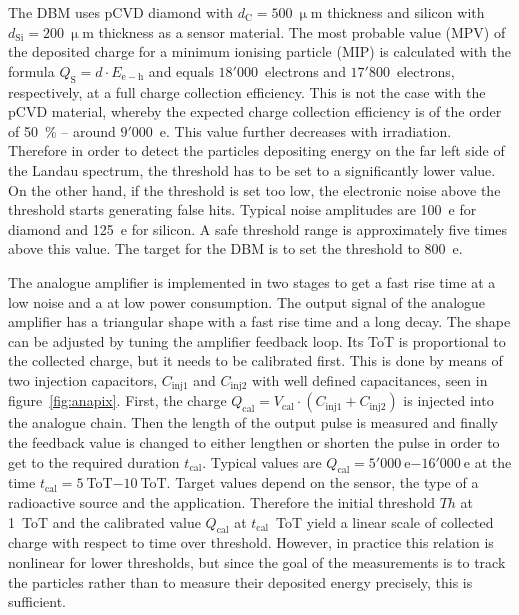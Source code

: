 The DBM uses pCVD diamond with $d_\mathrm{C}=500~\upmu$m thickness and silicon with $d_\mathrm{Si}=200~\upmu$m thickness as a sensor material. The most probable value (MPV) of the deposited charge for a minimum ionising particle (MIP) is calculated with the formula $Q_\mathrm{S}=d \cdot E_\mathrm{e-h}$ and equals $18'000$~electrons and $17'800$~electrons, respectively, at a full charge collection efficiency. This is not the case with the pCVD material, whereby the expected charge collection efficiency is of the order of 50~\%  -- around $9'000$~e. This value further decreases with irradiation. Therefore in order to detect the particles depositing energy on the far left side of the Landau spectrum, the threshold has to be set to a significantly lower value. On the other hand, if the threshold is set too low, the electronic noise above the threshold starts generating false hits. Typical noise amplitudes are 100~e for diamond and 125~e for silicon. A safe threshold range is approximately five times above this value. The target for the DBM is to set the threshold to 800~e.

The analogue amplifier is implemented in two stages to get a fast rise time at a low noise and a at low power consumption. The output signal of the analogue amplifier has a triangular shape with a fast rise time and a long decay.  The shape can be adjusted by tuning the amplifier feedback loop. Its ToT is proportional to the collected charge, but it needs to be calibrated first. This is done by means of two injection capacitors, $C_\mathrm{inj1}$ and $C_\mathrm{inj2}$ with well defined capacitances, seen in figure~\ref{fig:anapix}. First, the charge $Q_\mathrm{cal}=V_\mathrm{cal}\cdot(C_\mathrm{inj1}+C_\mathrm{inj2})$ is injected into the analogue chain. Then the length of the output pulse is measured and finally the feedback value is changed to either lengthen or shorten the pulse in order to get to the required duration $t_\mathrm{cal}$. Typical values are $Q_\mathrm{cal}=5'000~$e$-16'000~$e at the time $t_\mathrm{cal}=5~$ToT$-10~$ToT. Target values depend on the sensor, the type of a radioactive source and the application. Therefore the initial threshold $Th$ at 1~ToT and the calibrated value $Q_\mathrm{cal}$ at $t_\mathrm{cal}$~ToT yield a linear scale of collected charge with respect to time over threshold.
However, in practice this relation is nonlinear for lower thresholds, but since the goal of the measurements is to track the particles rather than to measure their deposited energy precisely, this is sufficient. 


